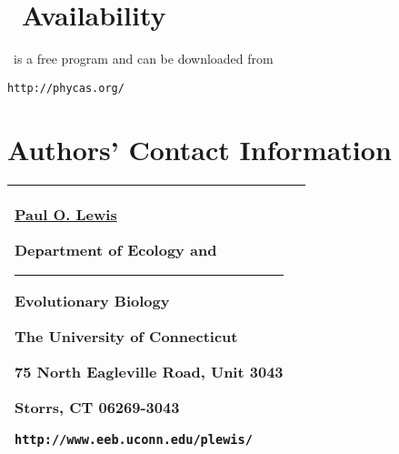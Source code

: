 
\section*{\Phycas\ Availability}

\Phycas\ is a free program and can be downloaded from 
\begin{verbatim}
http://phycas.org/
\end{verbatim}


\section*{Authors' Contact Information}

\begin{tabular}{|p{2.5in}|p{}|} \hline
\underline{Paul O. Lewis} \par
Department of Ecology and \par 
\rule{0.1in}{0.in} Evolutionary Biology \par
The University of Connecticut \par
75 North Eagleville Road, Unit 3043 \par
Storrs, CT 06269-3043 \par
{\tt \small http://www.eeb.uconn.edu/plewis/} \\ \hline
\end{tabular}

